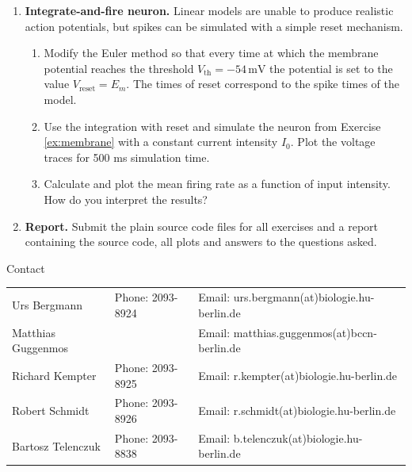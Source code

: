 \documentclass[12pt, a4]{article}
\begin{document}
\begin{enumerate}
    \item \textbf{Integrate-and-fire neuron.} Linear models are unable to 
	produce realistic action potentials, but
        spikes can be simulated with a simple reset mechanism.
        \begin{enumerate}

            \item Modify the Euler method so that every time at which the 
	    membrane potential reaches the threshold 
	    $V_\mathrm{th}=-54\,\mathrm{mV}$ the potential is set to the value
            $V_\mathrm{reset}=E_m$. The times of reset correspond to the spike 
	    times of the model.

            \item Use the integration with reset and simulate the neuron from
            Exercise \ref{ex:membrane} with a constant current intensity
            $I_0$. Plot the voltage traces for 500 ms simulation time.

            \item Calculate and plot the mean firing rate as a function of
            input intensity. How do you interpret the results?
        \end{enumerate}

    \item {\bf Report.} Submit the plain source code files for all exercises
        and a report containing the source code, all plots and answers to the
        questions asked.
\end{enumerate}

\vfill
\centerline{\CAP Contact}
\CAP

\begin{tabular}{lll}
Urs Bergmann & Phone: 2093-8924 & Email:
urs.bergmann(at)biologie.hu-berlin.de \\
Matthias Guggenmos & & Email: matthias.guggenmos(at)bccn-berlin.de \\
Richard Kempter \hfill & Phone: 2093-8925 \hfill & Email:
r.kempter(at)biologie.hu-berlin.de \\
Robert Schmidt & Phone: 2093-8926 & Email: r.schmidt(at)biologie.hu-berlin.de
\\
Bartosz Telenczuk & Phone: 2093-8838 & Email:
b.telenczuk(at)biologie.hu-berlin.de \\
\end{tabular}
\end{document}
